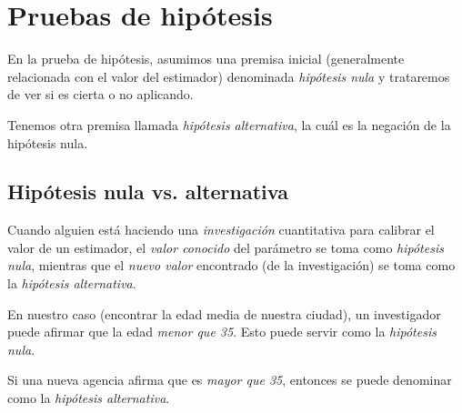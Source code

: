 \section{Pruebas de hipótesis}
% 
% 


En la prueba de hipótesis, asumimos una
premisa inicial (generalmente relacionada con el valor del estimador) denominada \emph{hipótesis nula}  y
trataremos de ver si es cierta o no aplicando.



Tenemos otra premisa llamada \emph{hipótesis alternativa}, la cuál es la negación de la hipótesis nula.


\subsection{Hipótesis nula vs. alternativa}
%
%
% 
%
% 
Cuando alguien está haciendo una \emph{investigación} cuantitativa para calibrar el valor de un estimador,  el \emph{valor conocido} del parámetro se toma como \emph{hipótesis nula},  mientras que el \emph{nuevo valor} encontrado (de la investigación) se toma como la \emph{hipótesis alternativa}.



En nuestro caso (encontrar la edad media de nuestra ciudad), un investigador puede afirmar que la edad
\emph{menor que 35}. Esto puede servir como la \emph{hipótesis nula}.


Si una nueva agencia afirma
que es \emph{mayor que 35}, entonces se puede denominar como la \emph{hipótesis alternativa}.

